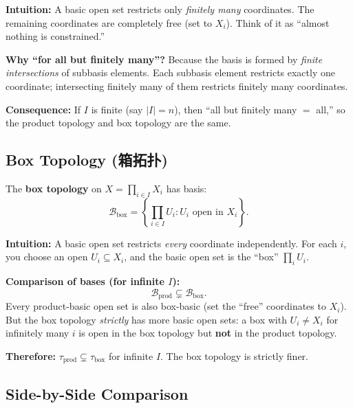 \documentclass{article}
\begin{document}
\textbf{Intuition:} A basic open set restricts only \emph{finitely
many} coordinates. The remaining coordinates are completely free (set to
$X_i$). Think of it as ``almost nothing is constrained.''

\textbf{Why ``for all but finitely many''?} Because the basis is formed
by \emph{finite intersections} of subbasis elements. Each subbasis
element restricts exactly one coordinate; intersecting finitely many of
them restricts finitely many coordinates.

\textbf{Consequence:} If $I$ is finite (say $|I| = n$), then ``all but
finitely many $=$ all,'' so the product topology and box topology are
the same.

\subsection{Box Topology (箱拓扑)}\label{def:box-topo}
\begin{definition}
  The \textbf{box topology} on $X = \prod_{i \in I} X_i$ has basis:
  \[
    \mathcal{B}_{\mathrm{box}} = \left\{\prod_{i \in I} U_i : U_i
    \text{ open in } X_i\right\}.
  \]
\end{definition}

\textbf{Intuition:} A basic open set restricts \emph{every} coordinate
independently. For each $i$, you choose an open $U_i \subseteq X_i$, and
the basic open set is the ``box'' $\prod_i U_i$.

\textbf{Comparison of bases (for infinite $I$):}
\[
  \mathcal{B}_{\mathrm{prod}} \subsetneq \mathcal{B}_{\mathrm{box}}.
\]
Every product-basic open set is also box-basic (set the ``free''
coordinates to $X_i$). But the box topology \emph{strictly} has more
basic open sets: a box with $U_i \ne X_i$ for infinitely many $i$ is
open in the box topology but \textbf{not} in the product topology.

\textbf{Therefore:} $\tau_{\mathrm{prod}} \subsetneq
\tau_{\mathrm{box}}$ for infinite $I$. The box topology is strictly
finer.

\subsection{Side-by-Side Comparison}
\end{document}
